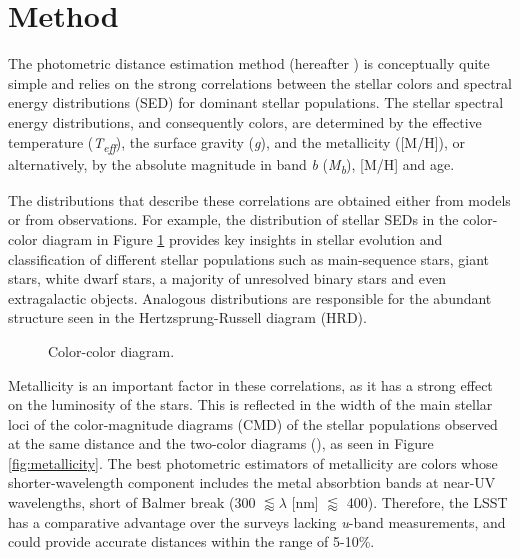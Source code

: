 
\section{Method} \label{sec:method}

The photometric distance estimation method (hereafter \pd) is conceptually quite simple and relies on the strong correlations between the stellar colors and spectral energy distributions (SED) for dominant stellar populations. The stellar spectral energy distributions, and consequently colors, are determined by the effective temperature (\textit{T\textsubscript{eff}}), the surface gravity (\textit{g}), and the metallicity ([M/H]), or alternatively, by the absolute magnitude in band \textit{b} (\textit{M\textsubscript{b}}), [M/H] and age.

The distributions that describe these correlations are obtained either from models or from observations. For example, the distribution of stellar SEDs in the color-color diagram in Figure \ref{fig:2c_example} provides key insights in stellar evolution and classification of different stellar populations such as main-sequence stars, giant stars, white dwarf stars, a majority of unresolved binary stars and even extragalactic objects. Analogous distributions are responsible for the abundant structure seen in the Hertzsprung-Russell diagram (HRD).

\begin{figure}[ht!]
	\caption{Color-color diagram.  \label{fig:2c_example}}
\end{figure}

Metallicity is an important factor in these correlations, as it has a strong effect on the luminosity of the stars. This is reflected in the width of the main stellar loci of the color-magnitude diagrams (CMD) of the stellar populations observed at the same distance and the two-color diagrams (), as seen in Figure \ref{fig:metallicity}. The best photometric estimators of metallicity are colors whose shorter-wavelength component includes the metal absorbtion bands at near-UV wavelengths, short of Balmer break (300 $\lessapprox\lambda$ [nm] $\lessapprox$ 400). Therefore, the LSST has a comparative advantage over the surveys lacking \textit{u}-band measurements, and could provide accurate distances within the range of 5-10\%. 

